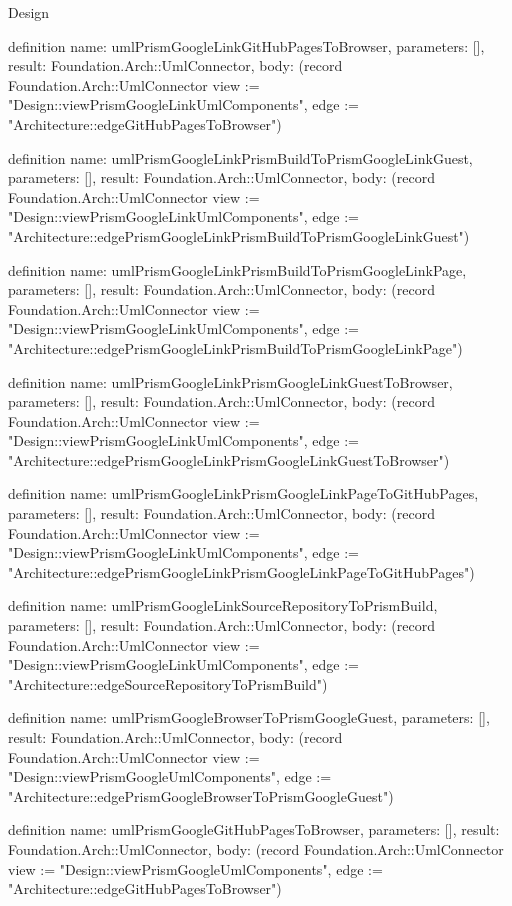 \begin{lexlean}{Design}
\begin{semanticmodule}
definition{
  name: umlPrismGoogleLinkGitHubPagesToBrowser,
  parameters: [],
  result: Foundation.Arch::UmlConnector,
  body: (record Foundation.Arch::UmlConnector {view := "Design::viewPrismGoogleLinkUmlComponents", edge := "Architecture::edgeGitHubPagesToBrowser"})
}

definition{
  name: umlPrismGoogleLinkPrismBuildToPrismGoogleLinkGuest,
  parameters: [],
  result: Foundation.Arch::UmlConnector,
  body: (record Foundation.Arch::UmlConnector {view := "Design::viewPrismGoogleLinkUmlComponents", edge := "Architecture::edgePrismGoogleLinkPrismBuildToPrismGoogleLinkGuest"})
}

definition{
  name: umlPrismGoogleLinkPrismBuildToPrismGoogleLinkPage,
  parameters: [],
  result: Foundation.Arch::UmlConnector,
  body: (record Foundation.Arch::UmlConnector {view := "Design::viewPrismGoogleLinkUmlComponents", edge := "Architecture::edgePrismGoogleLinkPrismBuildToPrismGoogleLinkPage"})
}

definition{
  name: umlPrismGoogleLinkPrismGoogleLinkGuestToBrowser,
  parameters: [],
  result: Foundation.Arch::UmlConnector,
  body: (record Foundation.Arch::UmlConnector {view := "Design::viewPrismGoogleLinkUmlComponents", edge := "Architecture::edgePrismGoogleLinkPrismGoogleLinkGuestToBrowser"})
}

definition{
  name: umlPrismGoogleLinkPrismGoogleLinkPageToGitHubPages,
  parameters: [],
  result: Foundation.Arch::UmlConnector,
  body: (record Foundation.Arch::UmlConnector {view := "Design::viewPrismGoogleLinkUmlComponents", edge := "Architecture::edgePrismGoogleLinkPrismGoogleLinkPageToGitHubPages"})
}

definition{
  name: umlPrismGoogleLinkSourceRepositoryToPrismBuild,
  parameters: [],
  result: Foundation.Arch::UmlConnector,
  body: (record Foundation.Arch::UmlConnector {view := "Design::viewPrismGoogleLinkUmlComponents", edge := "Architecture::edgeSourceRepositoryToPrismBuild"})
}

definition{
  name: umlPrismGoogleBrowserToPrismGoogleGuest,
  parameters: [],
  result: Foundation.Arch::UmlConnector,
  body: (record Foundation.Arch::UmlConnector {view := "Design::viewPrismGoogleUmlComponents", edge := "Architecture::edgePrismGoogleBrowserToPrismGoogleGuest"})
}

definition{
  name: umlPrismGoogleGitHubPagesToBrowser,
  parameters: [],
  result: Foundation.Arch::UmlConnector,
  body: (record Foundation.Arch::UmlConnector {view := "Design::viewPrismGoogleUmlComponents", edge := "Architecture::edgeGitHubPagesToBrowser"})
}


\end{semanticmodule}
\end{lexlean}
